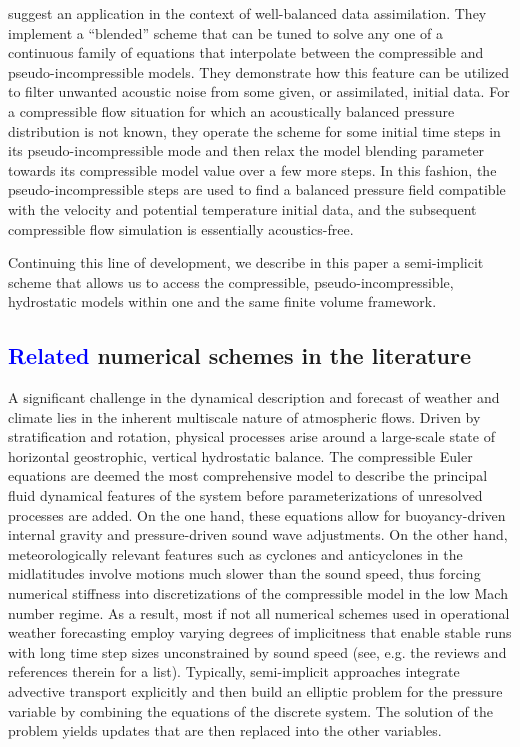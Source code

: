 \documentclass{ametsoc}
\theoremstyle{definition}
\newcommand{\klein}[1]{\textcolor{blue}{#1}}
\begin{document}
\citet{BenacchioEtAl2014} suggest an application in the context of well-balanced data assimilation. They implement a ``blended'' scheme that can be tuned to solve any one of a continuous family of equations that interpolate between the compressible and pseudo-incompressible models. They demonstrate how this feature can be utilized to filter unwanted acoustic noise from some given, or assimilated, initial data. For a compressible flow situation for which an acoustically balanced pressure distribution is not known, they operate the scheme for some initial time steps in its pseudo-incompressible mode and then relax the model blending parameter towards its compressible model value over a few more steps. In this fashion, the pseudo-incompressible steps are used to find a balanced pressure field compatible with the velocity and potential temperature initial data, and the subsequent compressible flow simulation is essentially acoustics-free.

Continuing this line of development, we describe in this paper a semi-implicit scheme that allows us to access the compressible, pseudo-incompressible, hydrostatic models within one and the same finite volume framework. 


\subsection{\klein{Related} numerical schemes in the literature}

A significant challenge in the dynamical description and forecast of weather and climate lies in the inherent multiscale nature of atmospheric flows. Driven by stratification and rotation, physical processes arise around a large-scale state of horizontal geostrophic, vertical hydrostatic balance. The compressible Euler equations are deemed the most comprehensive model to describe the principal fluid dynamical features of the system before parameterizations of unresolved processes are added. On the one hand, these equations allow for buoyancy-driven internal gravity and pressure-driven sound wave adjustments.  On the other hand, meteorologically relevant features such as cyclones and anticyclones in the midlatitudes involve motions much slower than the sound speed, thus forcing numerical stiffness into discretizations of the compressible model in the low Mach number regime. As a result, most if not all numerical schemes used in operational weather forecasting employ varying degrees of implicitness that enable stable runs with long time step sizes unconstrained by sound speed (see, e.g. the reviews \cite{MarrasEtAl2016, MengaldoEtAl2018} and references therein for a list). Typically, semi-implicit approaches integrate advective transport explicitly and then build an elliptic problem for the pressure variable by combining the equations of the discrete system. The solution of the problem yields updates that are then replaced into the other variables. 
\end{document}
